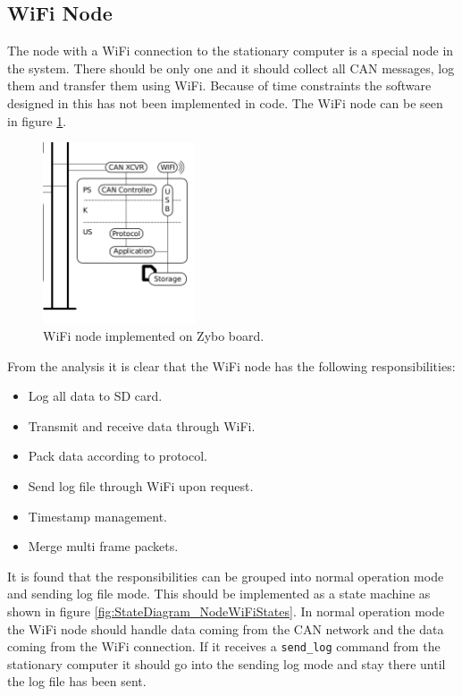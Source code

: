 \subsection{WiFi Node}
The node with a WiFi connection to the stationary computer is a special node in the system.
There should be only one and it should collect all CAN messages, log them and transfer them using WiFi.
Because of time constraints the software designed in this has not been implemented in code.
The WiFi node can be seen in figure \ref{fig:wifi_node}.

\begin{figure}[!h]
\centering
\includegraphics[width=0.4\textwidth]{graphics/wifi_node}
\caption{WiFi node implemented on Zybo board.}
\label{fig:wifi_node}
\end{figure}

From the analysis it is clear that the WiFi node has the following responsibilities:

\begin{itemize}
\item Log all data to SD card.
\item Transmit and receive data through WiFi.
\item Pack data according to protocol.
\item Send log file through WiFi upon request.
\item Timestamp management.
\item Merge multi frame packets.
\end{itemize}

It is found that the responsibilities can be grouped into normal operation mode and sending log file mode.
This should be implemented as a state machine as shown in figure \ref{fig:StateDiagram_NodeWiFiStates}.
In normal operation mode the WiFi node should handle data coming from the CAN network and the data coming from the WiFi connection.
If it receives a \texttt{send\_log} command from the stationary computer it should go into the sending log mode and stay there until the log file has been sent.


